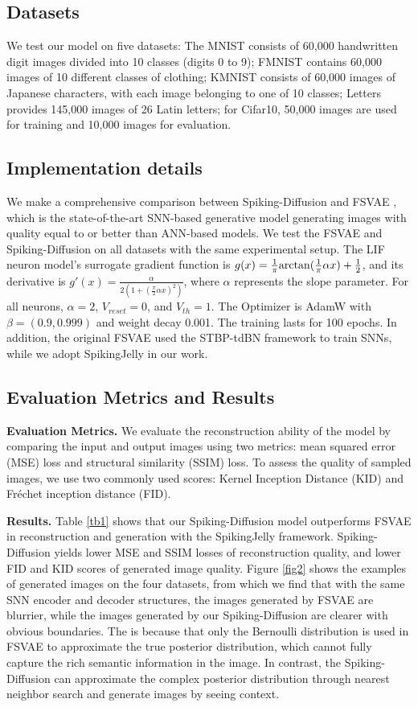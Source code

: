 \documentclass{article}
\begin{document}
\subsection{Datasets}
We test our model on five datasets: The MNIST \cite{b20} consists of 60,000 handwritten digit images divided into 10 classes (digits 0 to 9); FMNIST \cite{b31} contains 60,000 images of 10 different classes of clothing; KMNIST \cite{b32} consists of 60,000 images of Japanese characters, with each image belonging to one of 10 classes; Letters \cite{b33} provides 145,000 images of 26 Latin letters; for Cifar10\cite{cifar10}, 50,000 images are used for training and 10,000 images for evaluation.
\subsection{Implementation details}
We make a comprehensive comparison between Spiking-Diffusion and FSVAE \cite{b22}, which is the state-of-the-art SNN-based generative model generating images with quality equal to or better than ANN-based models. We test the FSVAE and Spiking-Diffusion on all datasets with the same experimental setup. The LIF neuron model's surrogate gradient function is $g(x)=\frac{1}{\pi}{\rm{arctan}}(\frac{1}{\pi}\alpha x)+\frac{1}{2}$, and its derivative is $g'(x)=\frac{\alpha}{2(1+(\frac{\pi}{2}\alpha x)^2)}$, where $\alpha$ represents the slope parameter. For all neurons, $\alpha=2$, $V_{reset}=0$, and $V_{th}=1$. The Optimizer is AdamW with $\beta=(0.9,0.999)$ and weight decay 0.001. The training lasts for 100 epochs. In addition, the original FSVAE used the STBP-tdBN \cite{b35} framework to train SNNs, while we adopt SpikingJelly \cite{b41} in our work. 

\subsection{Evaluation Metrics and Results}
\textbf{Evaluation Metrics.} We evaluate the reconstruction ability of the model by comparing the input and output images using two metrics: mean squared error (MSE) loss and structural similarity (SSIM) loss. To assess the quality of sampled images, we use two commonly used scores: Kernel Inception Distance (KID) and Fr\'{e}chet inception distance (FID). 

\textbf{Results.} Table \ref{tb1} shows that our Spiking-Diffusion model outperforms FSVAE in reconstruction and generation with the SpikingJelly framework. Spiking-Diffusion yields lower MSE and SSIM losses of reconstruction quality, and lower FID and KID scores of generated image quality. Figure \ref{fig2} shows the examples of generated images on the four datasets, from which we find that with the same SNN encoder and decoder structures, the images generated by FSVAE are blurrier, while the images generated by our Spiking-Diffusion are clearer with obvious boundaries. The is because that only the Bernoulli distribution is used in FSVAE to approximate the true posterior distribution, which cannot fully capture the rich semantic information in the image. In contrast, the Spiking-Diffusion can approximate the complex posterior distribution through nearest neighbor search and generate images by seeing context.
\end{document}
